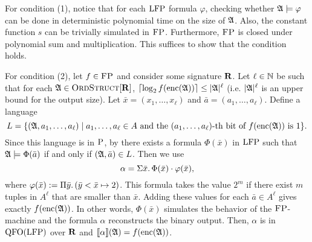 For condition (1), notice that for each ${\rm LFP}$ formula $\varphi$, checking whether $\mathfrak{A}\models\varphi$ can be done in deterministic polynomial time on the size of $\mathfrak{A}$\cite{I83}. Also, the constant function $s$ can be trivially simulated in $\text{\sc FP}$. Furthermore, $\text{\sc FP}$ is closed under polynomial sum and multiplication. This suffices to show that the condition holds.
	
For condition (2), let $f\in \text{\sc FP}$ and consider some signature $\mathbf{R}$.
Let $\ell\in\mathbb{N}$ be such that for each $\mathfrak{A}\in\text{\sc OrdStruct}[\mathbf{R}]$, $\lceil\log_2 f({\rm enc}(\mathfrak{A})) \rceil \leq \vert \mathfrak{A} \vert^\ell$ (i.e. $\vert \mathfrak{A} \vert^\ell$ is an upper bound for the output size).
Let $\bar{x} = (x_1,\ldots,x_{\ell})$ and $\bar{a} = (a_1,\ldots,a_{\ell})$.
Define a language
\[
L = \{(\mathfrak{A},a_1,\ldots,a_{\ell})\mid a_1,\ldots,a_{\ell}\in A \text{ and the } (a_1,\ldots,a_{\ell})\text{-th bit of }f({\rm enc}(\mathfrak{A}))\text{ is 1}\}.
\]
Since this language is in $\text{\sc P}$, by \cite{I83} there exists a formula $\Phi(\bar{x})$ in ${\rm LFP}$ such that $\mathfrak{A}\models\Phi(\bar{a})$ if and only if $(\mathfrak{A},\bar{a})\in L$. 
Then we use
$$
\alpha = \Sigma{\bar{x}}.\, \Phi(\bar{x})\cdot\varphi(\bar{x}),
$$
where $\varphi(\bar{x}) := \Pi{\bar{y}}.\,(\bar{y} < \bar{x} \mapsto 2)$. This formula takes the value $2^m$ if there exist $m$ tuples in $A^{\ell}$ that are smaller than $\bar{x}$. Adding these values for each $\bar{a}\in A^{\ell}$ gives exactly $f({\rm enc}(\mathfrak{A}))$. 
In other words, $\Phi(\bar{x})$ simulates the behavior of the $\text{\sc FP}$-machine and the formula $\alpha$ reconstructs the binary output.
Then, $\alpha$ is in ${\rm QFO}({\rm LFP})$ over $\mathbf{R}$ and ${\llbracket{}{\alpha}\rrbracket}(\mathfrak{A}) = f({\rm enc}(\mathfrak{A}))$.